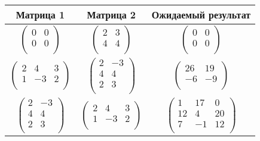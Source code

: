 \def\arraystretch{1.2}
\setlength\tabcolsep{0.5cm}

\begin{table}[h]
    \centering
    \begin{tabular}{|c|c|c|}
        \hline
        \bfseries Матрица 1  & \bfseries Матрица 2 & \bfseries Ожидаемый результат
        \\\hline
        $\begin{pmatrix} 0 & 0 \\ 0 & 0 \\ \end{pmatrix}$
        &
        $\begin{pmatrix} 2 & 3 \\ 4 & 4 \\ \end{pmatrix}$
        &
        $\begin{pmatrix} 0 & 0 \\ 0 & 0 \\ \end{pmatrix}$
        \\\hline

        $\begin{pmatrix} 2 & 4 & 3 \\ 1 & -3 & 2 \\ \end{pmatrix}$
        &
        $\begin{pmatrix} 2 & -3 \\ 4 & 4 \\ 2 & 3\\ \end{pmatrix}$
        &
        $\begin{pmatrix} 26 & 19 \\ -6 & -9 \\ \end{pmatrix}$
        \\\hline

        $\begin{pmatrix} 2 & -3 \\ 4 & 4 \\ 2 & 3\\ \end{pmatrix}$
        &
        $\begin{pmatrix} 2 & 4 & 3 \\ 1 & -3 & 2 \\ \end{pmatrix}$
        &
        $\begin{pmatrix} 1 & 17 & 0 \\ 12 & 4 & 20 \\ 7 & -1 & 12 \\ \end{pmatrix}$
        \\\hline


\end{tabular}
\end{table}
